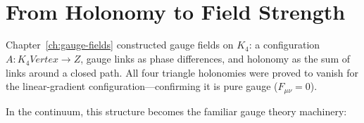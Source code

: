 \documentclass[11pt,a4paper]{book}
\def\mathbb#1{#1}%
\def\text#1{#1}%
\begin{document}
\begin{code}
\AgdaSymbol{:}\AgdaSpace{}%
\AgdaSpace{}%
\AgdaOperator{\AgdaPrimitive{*}}\AgdaSpace{}%
\AgdaSpace{}%
\AgdaSpace{}%
\<%
\\
%
\\[\AgdaEmptyExtraSkip]%
\>[0]\AgdaSpace{}%
\AgdaSymbol{:}\AgdaSpace{}%
\<%
\\
\>[0]\AgdaSpace{}%
\AgdaSymbol{=}\AgdaSpace{}%
\<%
\\
\>[0][@{}l@{\AgdaIndent{0}}]%
\>[2]\AgdaSymbol{\{}\AgdaSpace{}%
%
\>[24]\AgdaSymbol{=}\AgdaSpace{}%
\<%
\\
%
\>[2]\AgdaSymbol{;}\AgdaSpace{}%
%
\>[24]\AgdaSymbol{=}\AgdaSpace{}%
\<%
\\
%
\>[2]\AgdaSymbol{;}\AgdaSpace{}%
%
\>[24]\AgdaSymbol{=}\AgdaSpace{}%
\<%
\\
%
\>[2]\AgdaSymbol{;}\AgdaSpace{}%
%
\>[24]\AgdaSymbol{=}\AgdaSpace{}%
\<%
\\
%
\>[2]\AgdaSymbol{;}\AgdaSpace{}%
\AgdaSpace{}%
\AgdaSymbol{=}\AgdaSpace{}%
\<%
\\
%
\>[2]\AgdaSymbol{;}\AgdaSpace{}%
\AgdaSpace{}%
\AgdaSymbol{=}\AgdaSpace{}%
\AgdaSpace{}%
\AgdaSymbol{\}}\<%
\end{code}

\section{From Holonomy to Field Strength}
\label{sec:holonomy-to-field-strength}

Chapter~\ref{ch:gauge-fields} constructed gauge fields on $K_4$: a configuration $A : K_4\text{Vertex} \to \mathbb{Z}$, gauge links as phase differences, and holonomy as the sum of links around a closed path. All four triangle holonomies were proved to vanish for the linear-gradient configuration---confirming it is pure gauge ($F_{\mu\nu} = 0$).

In the continuum, this structure becomes the familiar gauge theory machinery:
\end{document}
